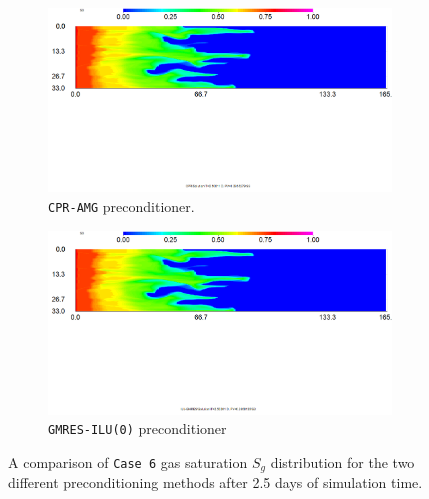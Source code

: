 \begin{figure}[h!]
\centering
\begin{subfigure}{.5\textwidth}
  \centering
  \includegraphics[width=1\linewidth]{figures/case6_cpr_sg.png}
  \caption{\texttt{CPR-AMG} preconditioner.}
\end{subfigure}%
\begin{subfigure}{.5\textwidth}
  \centering
  \includegraphics[width=1\linewidth]{figures/case6_ilu_sg.png}
  \caption{\texttt{GMRES-ILU(0)} preconditioner}
\end{subfigure}
\caption{A comparison of \texttt{Case 6} gas saturation $S_{g}$ distribution for the two different preconditioning methods after 2.5 days of simulation time.}
\label{case5sg}
\end{figure}

